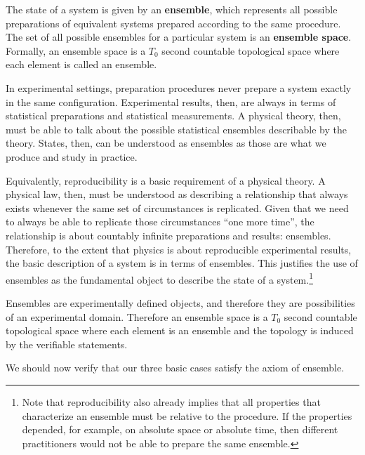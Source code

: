 \begin{mathSection}
	\begin{axiom} 
		The state of a system is given by an \textbf{ensemble}, which represents all possible preparations of equivalent systems prepared according to the same procedure. The set of all possible ensembles for a particular system is an \textbf{ensemble space}. Formally, an ensemble space is a $T_0$ second countable topological space where each element is called an ensemble.
	\end{axiom}
	
	\begin{justification}
		In experimental settings, preparation procedures never prepare a system exactly in the same configuration. Experimental results, then, are always in terms of statistical preparations and statistical measurements. A physical theory, then, must be able to talk about the possible statistical ensembles describable by the theory. States, then, can be understood as ensembles as those are what we produce and study in practice.
		
		Equivalently, reproducibility is a basic requirement of a physical theory. A physical law, then, must be understood as describing a relationship that always exists whenever the same set of circumstances is replicated. Given that we need to always be able to replicate those circumstances ``one more time'', the relationship is about countably infinite preparations and results: ensembles. Therefore, to the extent that physics is about reproducible experimental results, the basic description of a system is in terms of ensembles. This justifies the use of ensembles as the fundamental object to describe the state of a system.\footnote{Note that reproducibility also already implies that all properties that characterize an ensemble must be relative to the procedure. If the properties depended, for example, on absolute space or absolute time, then different practitioners would not be able to prepare the same ensemble.}
		
		Ensembles are experimentally defined objects, and therefore they are possibilities of an experimental domain. Therefore an ensemble space is a $T_0$ second countable topological space where each element is an ensemble and the topology is induced by the verifiable statements.
	\end{justification}
\end{mathSection}

We should now verify that our three basic cases satisfy the axiom of ensemble.

